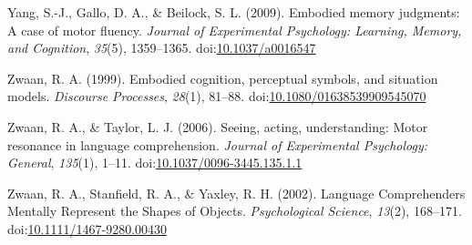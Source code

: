 \documentclass[english,man]{apa6}
\theoremstyle{definition}
\theoremstyle{definition}
\theoremstyle{definition}
\theoremstyle{remark}
\begin{document}
\hypertarget{ref-Yang2009}{}
Yang, S.-J., Gallo, D. A., \& Beilock, S. L. (2009). Embodied memory
judgments: A case of motor fluency. \emph{Journal of Experimental
Psychology: Learning, Memory, and Cognition}, \emph{35}(5), 1359--1365.
doi:\href{https://doi.org/10.1037/a0016547}{10.1037/a0016547}

\hypertarget{ref-Zwaan1999}{}
Zwaan, R. A. (1999). Embodied cognition, perceptual symbols, and
situation models. \emph{Discourse Processes}, \emph{28}(1), 81--88.
doi:\href{https://doi.org/10.1080/01638539909545070}{10.1080/01638539909545070}

\hypertarget{ref-Zwaan2006}{}
Zwaan, R. A., \& Taylor, L. J. (2006). Seeing, acting, understanding:
Motor resonance in language comprehension. \emph{Journal of Experimental
Psychology: General}, \emph{135}(1), 1--11.
doi:\href{https://doi.org/10.1037/0096-3445.135.1.1}{10.1037/0096-3445.135.1.1}

\hypertarget{ref-Zwaan2002}{}
Zwaan, R. A., Stanfield, R. A., \& Yaxley, R. H. (2002). Language
Comprehenders Mentally Represent the Shapes of Objects.
\emph{Psychological Science}, \emph{13}(2), 168--171.
doi:\href{https://doi.org/10.1111/1467-9280.00430}{10.1111/1467-9280.00430}
\end{document}
